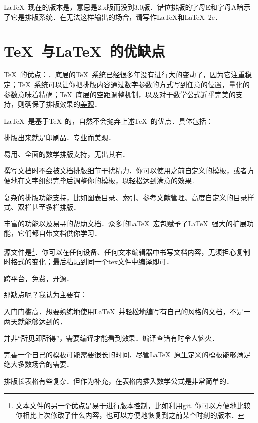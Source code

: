 \LaTeX\ 现在的版本是\LaTeXe ，意思是2.x版而没到3.0版．错位排版的字母E和字母A暗示了它是排版系统．在无法这样输出的场合，请写作LaTeX和LaTeX~2e．

\section{\TeX\ 与\LaTeX\ 的优缺点}
\TeX\ 的优点：．底层的\TeX\ 系统已经很多年没有进行大的变动了，因为它注重\uline{稳定}；\TeX\ 系统可以让你把排版内容通过数字参数的方式写到任意的位置，量化的参数意味着\uline{精确}；\TeX\ 底层的空距调整机制，以及对于数学公式近乎完美的支持，则确保了排版效果的\uline{美观}．

\LaTeX\ 是基于\TeX\ 的，自然不会抛弃上述\TeX\ 的优点．具体包括：
\begin{feai}
\item 排版出来就是印刷品．专业而美观．
\item 易用、全面的数学排版支持，无出其右．
\item 撰写文档时不会被文档排版细节干扰精力．你可以使用之前自定义的模板，或者方便地在文字组织完毕后调整你的模板，以轻松达到满意的效果．
\item 复杂的排版功能支持，比如图表目录、索引、参考文献管理、高度自定义的目录样式、双栏甚至多栏排版．
\item 丰富的功能以及易寻的帮助文档．众多的\LaTeX\ 宏包赋予了\LaTeX\ 强大的扩展功能，它们都自带文档供你学习．
\item 源文件是\footnote{文本文件的另一个优点是易于进行版本控制，比如利用git. 你可以方便地比较你相比上次修改了什么内容，也可以方便地恢复到之前某个时刻的版本．}．你可以在任何设备、任何文本编辑器中书写文档内容，无须担心复制时格式的变化；最后粘贴到同一个tex文件中编译即可．
\item 跨平台，免费，开源．
\end{feai}

那缺点呢？我认为主要有：
\begin{feai}
\item 入门门槛高．想要熟练地使用\LaTeX\ 并轻松地编写有自己的风格的文档，不是一两天就能够达到的．
\item 并非“所见即所得”，需要编译才能看到效果．编译查错有时令人恼火．
\item 完善一个自己的模板可能需要很长的时间．尽管\LaTeX\ 原生定义的模板能够满足绝大多数场合的需要．
\item 排版长表格有些复杂．但作为补充，在表格内插入数学公式是非常简单的．
\end{feai}

